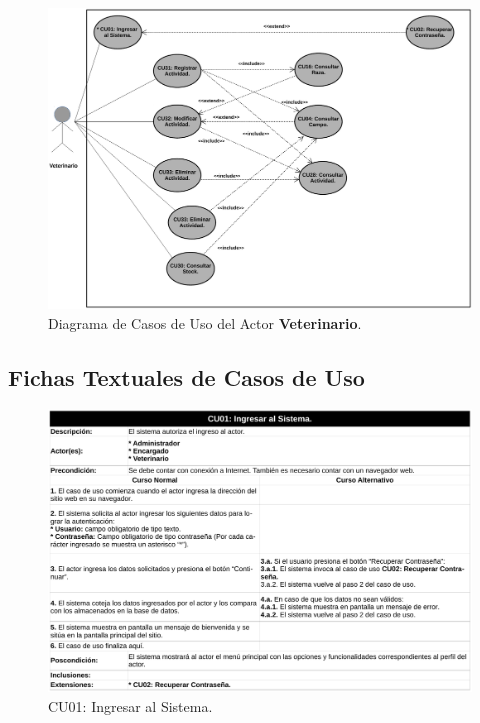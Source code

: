 \documentclass[11pt,oneside]{book}
\begin{document}
\begin{figure}[tbhp]
\centerline{\includegraphics[scale=0.5]{figs/Diagrama_CU_Veterinario.pdf}}
\caption{Diagrama de Casos de Uso del Actor \textbf{Veterinario}.}
\label{Ap104}
\end{figure}

\newpage
\clearpage
\subsection{Fichas Textuales de Casos de Uso}\label{ApFCU}

\begin{figure}[tbhp]
\centerline{\includegraphics[scale=0.6]{Fichas_CU/pg_0001.pdf}}
\caption{CU01: Ingresar al Sistema.}
\label{Ap201}
\end{figure}
\end{document}
